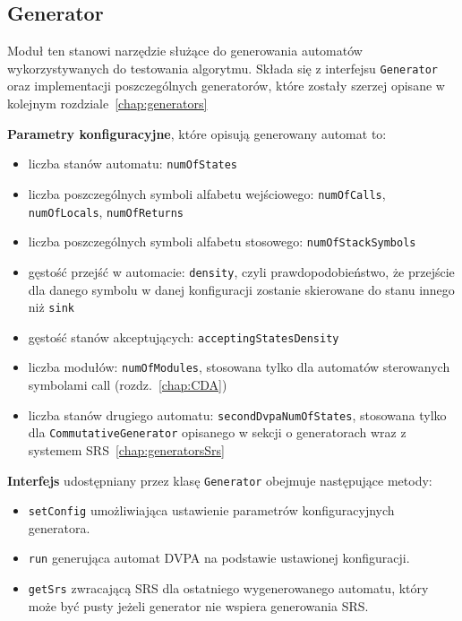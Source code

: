 \subsection{Generator}

Moduł ten stanowi narzędzie służące do generowania automatów wykorzystywanych do testowania algorytmu.
Składa się z interfejsu \texttt{Generator} oraz implementacji poszczególnych generatorów, które zostały szerzej opisane w kolejnym
rozdziale~\ref{chap:generators}

\textbf{Parametry konfiguracyjne}, które opisują generowany automat to: 

\begin{itemize}
    \item liczba stanów automatu: \texttt{numOfStates}
    \item liczba poszczególnych symboli alfabetu wejściowego: \texttt{numOfCalls}, \texttt{numOfLocals}, \texttt{numOfReturns}
    \item liczba poszczególnych symboli alfabetu stosowego: \texttt{numOfStackSymbols}
    \item gęstość przejść w automacie: \texttt{density}, czyli prawdopodobieństwo, że przejście dla danego symbolu w danej konfiguracji zostanie skierowane do stanu innego niż \texttt{sink}
    \item gęstość stanów akceptujących: \texttt{acceptingStatesDensity}
    \item liczba modułów: \texttt{numOfModules}, stosowana tylko dla automatów sterowanych symbolami call (rozdz.~\ref{chap:CDA})
    \item liczba stanów drugiego automatu: \texttt{secondDvpaNumOfStates}, stosowana tylko dla \texttt{CommutativeGenerator} 
          opisanego w sekcji o generatorach wraz z systemem SRS~\ref{chap:generatorsSrs}
\end{itemize}

\textbf{Interfejs} udostępniany przez klasę \texttt{Generator} obejmuje następujące metody:
\begin{itemize}
    \item \texttt{setConfig} umożliwiająca ustawienie parametrów konfiguracyjnych generatora.
    \item \texttt{run} generująca automat DVPA na podstawie ustawionej konfiguracji.
    \item \texttt{getSrs} zwracającą SRS dla ostatniego wygenerowanego automatu, który może być pusty jeżeli generator nie wspiera generowania SRS.
\end{itemize}

